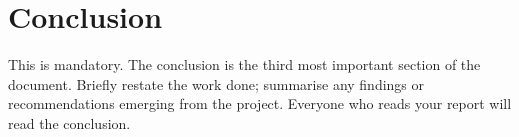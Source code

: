 \chapter{Conclusion}

This is mandatory. The conclusion is the third most important section
of the document. Briefly restate the work done; summarise any findings
or recommendations emerging from the project. Everyone who reads your
report will read the conclusion.
